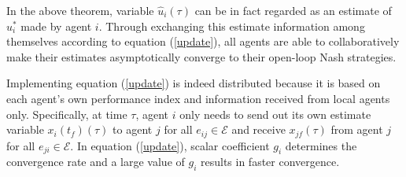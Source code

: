 \documentclass[10pt,doublecolumn]{IEEEtran}  %
\begin{document}
In the above theorem, variable $\hat{u}_i(\tau)$ can be in fact regarded as an estimate of $u_i^*$ made by agent $i$. Through exchanging this estimate information among themselves according to equation (\ref{update}), all agents are able to collaboratively make their estimates asymptotically converge to their open-loop Nash strategies. 

Implementing equation (\ref{update}) is indeed distributed because it is based on each agent's own performance index and information received from local agents only. Specifically, at time $\tau$, agent $i$ only needs to send out its own estimate variable $x_i(t_f)(\tau)$ to agent $j$ for all $e_{ij}\in\mathcal{E}$ and receive $x_{jf}(\tau)$ from agent $j$ for all $e_{ji}\in\mathcal{E}$. In equation (\ref{update}), scalar coefficient $g_i$ determines the convergence rate and a large value of $g_i$ results in faster convergence.
\end{document}
